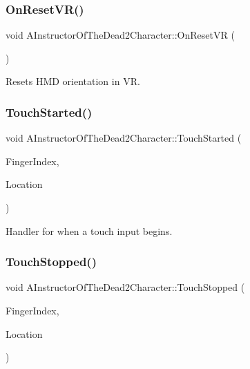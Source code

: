 \subsubsection{\texorpdfstring{On\+Reset\+V\+R()}{OnResetVR()}}
{\footnotesize\ttfamily void A\+Instructor\+Of\+The\+Dead2\+Character\+::\+On\+Reset\+VR (\begin{DoxyParamCaption}{ }\end{DoxyParamCaption})\hspace{0.3cm}{\ttfamily [protected]}}

Resets H\+MD orientation in VR. \mbox{\label{class_a_instructor_of_the_dead2_character_aaf275b2c17de5ce577aa5a0e4202b222}} 
\subsubsection{\texorpdfstring{Touch\+Started()}{TouchStarted()}}
{\footnotesize\ttfamily void A\+Instructor\+Of\+The\+Dead2\+Character\+::\+Touch\+Started (\begin{DoxyParamCaption}\item[{E\+Touch\+Index\+::\+Type}]{Finger\+Index,  }\item[{F\+Vector}]{Location }\end{DoxyParamCaption})\hspace{0.3cm}{\ttfamily [protected]}}

Handler for when a touch input begins. \mbox{\label{class_a_instructor_of_the_dead2_character_af518d02c1c15d184cd2e75a7aad9b6a5}} 
\subsubsection{\texorpdfstring{Touch\+Stopped()}{TouchStopped()}}
{\footnotesize\ttfamily void A\+Instructor\+Of\+The\+Dead2\+Character\+::\+Touch\+Stopped (\begin{DoxyParamCaption}\item[{E\+Touch\+Index\+::\+Type}]{Finger\+Index,  }\item[{F\+Vector}]{Location }\end{DoxyParamCaption})\hspace{0.3cm}{\ttfamily [protected]}}

